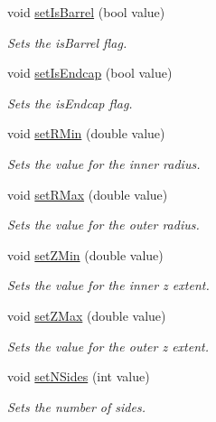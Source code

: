 \begin{DoxyCompactItemize}
void \hyperlink{class_d_d4hep_1_1_d_d_rec_1_1_subdetector_extension_impl_ad63db1c5bca1c435c0f79514f47798d0}{set\+Is\+Barrel} (bool value)
\begin{DoxyCompactList}\small\item\em Sets the is\+Barrel flag. \end{DoxyCompactList}\item 
void \hyperlink{class_d_d4hep_1_1_d_d_rec_1_1_subdetector_extension_impl_acd89d4d2553a6ba4006ad39631fa864b}{set\+Is\+Endcap} (bool value)
\begin{DoxyCompactList}\small\item\em Sets the is\+Endcap flag. \end{DoxyCompactList}\item 
void \hyperlink{class_d_d4hep_1_1_d_d_rec_1_1_subdetector_extension_impl_af2d58ea0ea65579e473364de314720ca}{set\+R\+Min} (double value)
\begin{DoxyCompactList}\small\item\em Sets the value for the inner radius. \end{DoxyCompactList}\item 
void \hyperlink{class_d_d4hep_1_1_d_d_rec_1_1_subdetector_extension_impl_a3b92ffbf335b41a30b001f8bb09c985d}{set\+R\+Max} (double value)
\begin{DoxyCompactList}\small\item\em Sets the value for the outer radius. \end{DoxyCompactList}\item 
void \hyperlink{class_d_d4hep_1_1_d_d_rec_1_1_subdetector_extension_impl_a36879a3796e4eeccdc1d2ec1050894a8}{set\+Z\+Min} (double value)
\begin{DoxyCompactList}\small\item\em Sets the value for the inner z extent. \end{DoxyCompactList}\item 
void \hyperlink{class_d_d4hep_1_1_d_d_rec_1_1_subdetector_extension_impl_ad4ff27b7c8cf4e9f0cdcd595fb271226}{set\+Z\+Max} (double value)
\begin{DoxyCompactList}\small\item\em Sets the value for the outer z extent. \end{DoxyCompactList}\item 
void \hyperlink{class_d_d4hep_1_1_d_d_rec_1_1_subdetector_extension_impl_a5cbc7835f1656dbb21ce4c9d3442a74b}{set\+N\+Sides} (int value)
\begin{DoxyCompactList}\small\item\em Sets the number of sides. \end{DoxyCompactList}\end{DoxyCompactItemize}
